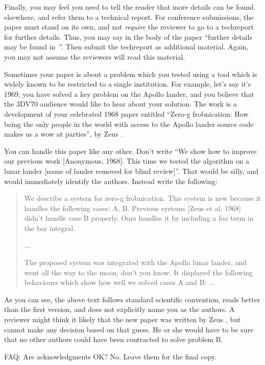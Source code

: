 \documentclass[10pt,twocolumn,letterpaper]{article}
\begin{document}
Finally, you may feel you need to tell the reader that more details can be
found elsewhere, and refer them to a technical report.  For conference
submissions, the paper must stand on its own, and not {\em require} the
reviewer to go to a techreport for further details.  Thus, you may say in
the body of the paper ``further details may be found
in~\cite{Authors12bfinal}''.  Then submit the techreport as additional material.
Again, you may not assume the reviewers will read this material.

Sometimes your paper is about a problem which you tested using a tool which
is widely known to be restricted to a single institution.  For example,
let's say it's 1969, you have solved a key problem on the Apollo lander,
and you believe that the 3DV70 audience would like to hear about your
solution.  The work is a development of your celebrated 1968 paper entitled
``Zero-g frobnication: How being the only people in the world with access to
the Apollo lander source code makes us a wow at parties'', by Zeus \etal.

You can handle this paper like any other.  Don't write ``We show how to
improve our previous work [Anonymous, 1968].  This time we tested the
algorithm on a lunar lander [name of lander removed for blind review]''.
That would be silly, and would immediately identify the authors. Instead
write the following:
\begin{quotation}
\noindent
   We describe a system for zero-g frobnication.  This
   system is new because it handles the following cases:
   A, B.  Previous systems [Zeus et al. 1968] didn't
   handle case B properly.  Ours handles it by including
   a foo term in the bar integral.

   ...

   The proposed system was integrated with the Apollo
   lunar lander, and went all the way to the moon, don't
   you know.  It displayed the following behaviours
   which show how well we solved cases A and B: ...
\end{quotation}
As you can see, the above text follows standard scientific convention,
reads better than the first version, and does not explicitly name you as
the authors.  A reviewer might think it likely that the new paper was
written by Zeus \etal, but cannot make any decision based on that guess.
He or she would have to be sure that no other authors could have been
contracted to solve problem B.

FAQ: Are acknowledgments OK?  No.  Leave them for the final copy.
\end{document}
